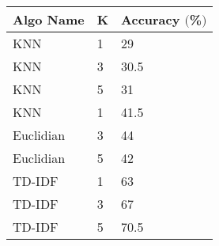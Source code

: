 \documentclass[11pt]{article}
\begin{document}
\begin{tabular}{|l|l|l|}
\hline
	Algo Name & K & Accuracy $($\%$)$ \\
\hline
	KNN & 1 & 29\\
\hline
	KNN & 3 & 30.5\\
\hline
	KNN & 5 & 31\\
\hline
	KNN & 1 & 41.5\\
\hline
	Euclidian & 3 & 44\\
\hline
	Euclidian & 5 & 42\\
\hline
	TD-IDF & 1 & 63\\
\hline
	TD-IDF & 3 & 67\\
\hline
	TD-IDF & 5 & 70.5\\
\hline
\end{tabular}
\end{document}
